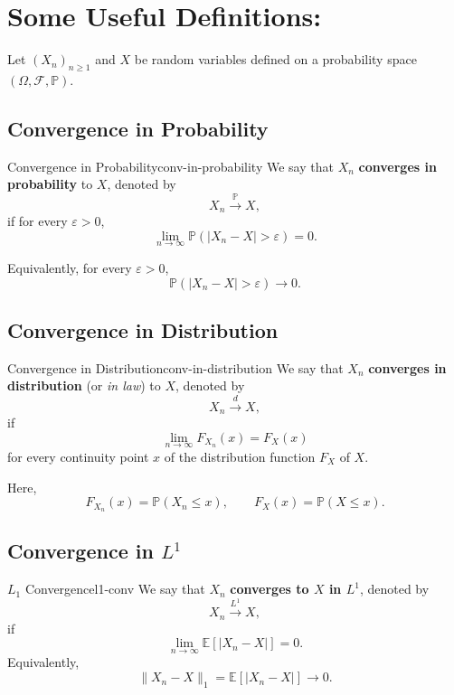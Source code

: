 \section{Some Useful Definitions:}
Let $(X_n)_{n\geq1}$ and $X$ be random variables defined on a
probability space $(\Omega,\mathcal{F},\mathbb{P})$.

\subsection{Convergence in Probability}

\begin{definition}{Convergence in Probability}{conv-in-probability}
We say that $X_n$ \textbf{converges in probability} to $X$, denoted by
\[
    X_n \xrightarrow{\mathbb{P}} X,
\]
if for every $\varepsilon>0$,
\[
    \lim_{n\to\infty}
    \mathbb{P}\left(
        |X_n-X|>\varepsilon
    \right)
    =0.
\]

Equivalently, for every $\varepsilon>0$,
\[
    \mathbb{P}\left(
        |X_n-X|>\varepsilon
    \right)
    \longrightarrow 0.
\]
\end{definition}

\subsection{Convergence in Distribution}

\begin{definition}{Convergence in Distribution}{conv-in-distribution}
We say that $X_n$ \textbf{converges in distribution} (or \emph{in law})
to $X$, denoted by
\[
    X_n \xrightarrow{d} X,
\]
if
\[
    \lim_{n\to\infty}F_{X_n}(x)
    =
    F_X(x)
\]
for every continuity point $x$ of the distribution function $F_X$ of
$X$.

Here,
\[
    F_{X_n}(x)
    =
    \mathbb{P}(X_n\leq x),
    \qquad
    F_X(x)
    =
    \mathbb{P}(X\leq x).
\]
\end{definition}
\subsection{\texorpdfstring{Convergence in $L^1$}{Convergence in L1}}

\begin{definition}{\texorpdfstring{$L_1$}{L1} Convergence}{l1-conv}
    We say that $X_n$ \textbf{converges to $X$ in $L^1$}, denoted by
\[
    X_n \xrightarrow{L^1} X,
\]
if
\[
    \lim_{n\to\infty}
    \mathbb{E}\left[|X_n-X|\right]
    =0.
\]
Equivalently,
\[
    \|X_n-X\|_1
    =
    \mathbb{E}\left[|X_n-X|\right]
    \longrightarrow 0.
\]
\end{definition}

